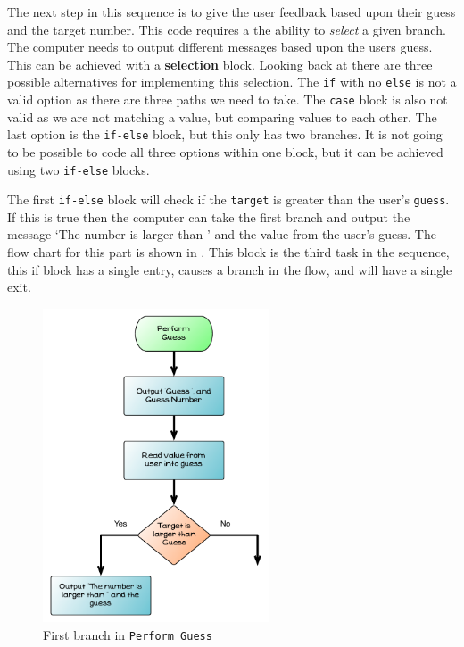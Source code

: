 \clearpage
The next step in this sequence is to give the user feedback based upon their guess and the target number. This code requires a the ability to \emph{select} a given branch. The computer needs to output different messages based upon the users guess. This can be achieved with a \textbf{selection} block. Looking back at  there are three possible alternatives for implementing this selection. The \texttt{if} with no \texttt{else} is not a valid option as there are three paths we need to take. The \texttt{case} block is also not valid as we are not matching a value, but comparing values to each other. The last option is the \texttt{if-else} block, but this only has two branches. It is not going to be possible to code all three options within one block, but it can be achieved using two \texttt{if-else} blocks.

The first \texttt{if-else} block will check if the \texttt{target} is greater than the user's \texttt{guess}. If this is true then the computer can take the first branch and output the message `The number is larger than ' and the value from the user's guess. The flow chart for this part is shown in . This block is the third task in the sequence, this if block has a single entry, causes a branch in the flow, and will have a single exit.

\begin{figure}[h]
   \centering
   \includegraphics[width=0.6\textwidth]{./topics/control-flow/diagrams/PerformGuess2} 
   \caption{First branch in \texttt{Perform Guess}}
   \label{fig:perform-guess-seq-2}
\end{figure}

